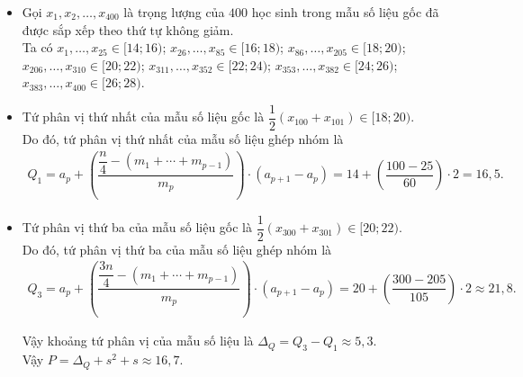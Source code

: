 \begin{bt}
{\begin{itemize}
			\item	Gọi $x_1, x_2, \dots, x_{400}$ là trọng lượng của $400$ học sinh trong mẫu số liệu gốc đã được sắp xếp theo thứ tự không giảm.\\
			Ta có $x_1, \dots, x_{25} \in [14; 16)$; $x_{26}, \dots, x_{85} \in [16; 18)$; $x_{86}, \dots, x_{205} \in [18; 20)$; $x_{206}, \dots, x_{310} \in [20; 22)$; $x_{311}, \dots, x_{352} \in [22; 24)$; $x_{353}, \dots, x_{382} \in [24; 26)$; $x_{383}, \dots, x_{400} \in [26; 28)$.
			\item	Tứ phân vị thứ nhất của mẫu số liệu gốc là $\dfrac{1}{2}(x_{100} + x_{101}) \in [18; 20)$.\\
			Do đó, tứ phân vị thứ nhất của mẫu số liệu ghép nhóm là
			\begin{align*}
				Q_1=a_{p}+\left(\dfrac{\dfrac{n}{4}-\left(m_1+\cdots+m_{p-1}\right)}{m_{p}}\right)\cdot\left(a_{p+1}-a_{p}\right)
				=14+\left(\dfrac{100-25}{60}\right)\cdot2=16{,}5.
			\end{align*}
			\item  Tứ phân vị thứ ba của mẫu số liệu gốc là $\dfrac{1}{2}(x_{300} + x_{301}) \in [20; 22)$.\\
			Do đó, tứ phân vị thứ ba của mẫu số liệu ghép nhóm là
			\begin{align*}
				Q_{3}=a_{p}+\left(\dfrac{\dfrac{3 n}{4}-\left(m_1+\cdots+m_{p-1}\right)}{m_{p}}\right)\cdot\left(a_{p+1}-a_{p}\right)
				=20+\left(\dfrac{300-205}{105}\right)\cdot 2\approx 21{,}8.
			\end{align*}
			
			Vậy khoảng tứ phân vị của mẫu số liệu là $\Delta _Q = Q_3 - Q_1  \approx 5{,}3$.\\
			Vậy $P=\Delta _Q+s^2+s \approx 16{,}7$.
		\end{itemize}
	}
\end{bt}

